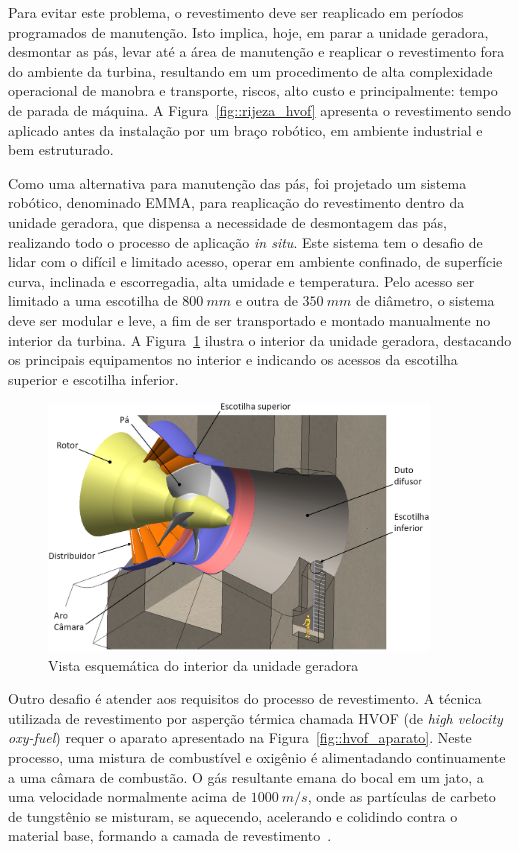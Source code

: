 Para evitar este problema, o revestimento deve ser reaplicado em períodos
programados de manutenção. Isto implica, hoje, em parar a unidade geradora,
desmontar as pás, levar até a área de manutenção e reaplicar o revestimento fora
do ambiente da turbina, resultando em um procedimento de alta complexidade
operacional de manobra e transporte, riscos, alto custo e principalmente: tempo
de parada de máquina. A Figura~\ref{fig::rijeza_hvof}
apresenta o revestimento sendo aplicado antes da instalação por um braço
robótico, em ambiente industrial e bem estruturado.

Como uma alternativa para manutenção das pás, foi projetado um sistema robótico,
denominado EMMA, para reaplicação do revestimento dentro da unidade geradora,
que dispensa a necessidade de desmontagem das pás, realizando todo o processo de
aplicação \textit{in situ}. Este sistema tem o desafio de lidar com o difícil
e limitado acesso, operar em ambiente confinado, de superfície curva, inclinada
e escorregadia, alta umidade e temperatura. Pelo acesso ser limitado a uma
escotilha de $800~mm$ e outra de $350~mm$ de diâmetro, o sistema deve ser
modular e leve, a fim de ser transportado e montado manualmente no interior da
turbina. A Figura~\ref{fig::turbina_ug} ilustra o interior da unidade geradora,
destacando os principais equipamentos no interior e indicando os acessos da
escotilha superior e escotilha inferior.

\begin{figure}[h]
	\centering 
 	\includegraphics[width=0.90\textwidth]{figs/turbina_ug}
 	\caption{Vista esquemática do interior da unidade geradora}
 	\label{fig::turbina_ug}
\end{figure}

Outro desafio é atender aos requisitos do processo de revestimento. A técnica
utilizada de revestimento por asperção térmica chamada HVOF (de \textit{high
velocity oxy-fuel}) requer o aparato apresentado na
Figura~\ref{fig::hvof_aparato}. Neste processo, uma mistura de combustível e
oxigênio é alimentadando continuamente a uma câmara de combustão. O gás
resultante emana do bocal em um jato, a uma velocidade normalmente acima de
$1000~m/s$, onde as partículas de carbeto de tungstênio se misturam, se
aquecendo, acelerando e colidindo contra o material base, formando a camada de
revestimento~\cite{kuroda2008warm}.

